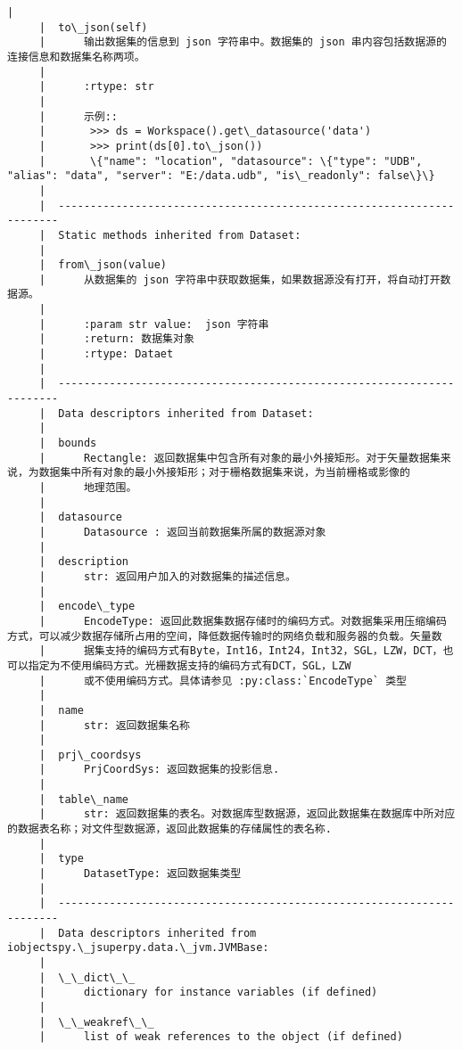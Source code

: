 \documentclass[11pt]{article}
\begin{document}
\begin{Verbatim}[commandchars=\\\{\}]
     |  
     |  to\_json(self)
     |      输出数据集的信息到 json 字符串中。数据集的 json 串内容包括数据源的连接信息和数据集名称两项。
     |      
     |      :rtype: str
     |      
     |      示例::
     |       >>> ds = Workspace().get\_datasource('data')
     |       >>> print(ds[0].to\_json())
     |       \{"name": "location", "datasource": \{"type": "UDB", "alias": "data", "server": "E:/data.udb", "is\_readonly": false\}\}
     |  
     |  ----------------------------------------------------------------------
     |  Static methods inherited from Dataset:
     |  
     |  from\_json(value)
     |      从数据集的 json 字符串中获取数据集，如果数据源没有打开，将自动打开数据源。
     |      
     |      :param str value:  json 字符串
     |      :return: 数据集对象
     |      :rtype: Dataet
     |  
     |  ----------------------------------------------------------------------
     |  Data descriptors inherited from Dataset:
     |  
     |  bounds
     |      Rectangle: 返回数据集中包含所有对象的最小外接矩形。对于矢量数据集来说，为数据集中所有对象的最小外接矩形；对于栅格数据集来说，为当前栅格或影像的
     |      地理范围。
     |  
     |  datasource
     |      Datasource : 返回当前数据集所属的数据源对象
     |  
     |  description
     |      str: 返回用户加入的对数据集的描述信息。
     |  
     |  encode\_type
     |      EncodeType: 返回此数据集数据存储时的编码方式。对数据集采用压缩编码方式，可以减少数据存储所占用的空间，降低数据传输时的网络负载和服务器的负载。矢量数
     |      据集支持的编码方式有Byte，Int16，Int24，Int32，SGL，LZW，DCT，也可以指定为不使用编码方式。光栅数据支持的编码方式有DCT，SGL，LZW
     |      或不使用编码方式。具体请参见 :py:class:`EncodeType` 类型
     |  
     |  name
     |      str: 返回数据集名称
     |  
     |  prj\_coordsys
     |      PrjCoordSys: 返回数据集的投影信息.
     |  
     |  table\_name
     |      str: 返回数据集的表名。对数据库型数据源，返回此数据集在数据库中所对应的数据表名称；对文件型数据源，返回此数据集的存储属性的表名称.
     |  
     |  type
     |      DatasetType: 返回数据集类型
     |  
     |  ----------------------------------------------------------------------
     |  Data descriptors inherited from iobjectspy.\_jsuperpy.data.\_jvm.JVMBase:
     |  
     |  \_\_dict\_\_
     |      dictionary for instance variables (if defined)
     |  
     |  \_\_weakref\_\_
     |      list of weak references to the object (if defined)
    

\end{Verbatim}
\end{document}
